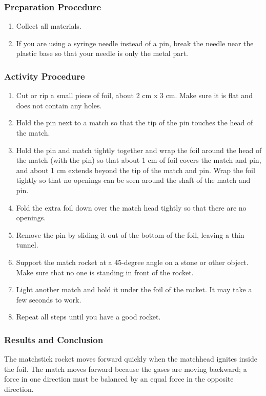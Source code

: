 \subsubsection*{Preparation Procedure}
\begin{enumerate}
\item{Collect all materials.} 
\item{If you are using a syringe needle instead of a pin, break the needle near the plastic base so that your needle is only the metal part.} 
\end{enumerate}

\subsubsection*{Activity Procedure}
\begin{enumerate}
\item{Cut or rip a small piece of foil, about 2 cm x 3 cm. Make sure it is flat and does not contain any holes.} 
\item{Hold the pin next to a match so that the tip of the pin touches the head of the match.} 
\item{Hold the pin and match tightly together and wrap the foil around the head of the match (with the pin) so that about 1 cm of foil covers the match and pin, and about 1 cm extends beyond the tip of the match and pin. Wrap the foil tightly so that no openings can be seen around the shaft of the match and pin.} 
\item{Fold the extra foil down over the match head tightly so that there are no openings.} 
\item{Remove the pin by sliding it out of the bottom of the foil, leaving a thin tunnel.} 
\item{Support the match rocket at a 45-degree angle on a stone or other object. Make sure that no one is standing in front of the rocket.} 
\item{Light another match and hold it under the foil of the rocket. It may take a few seconds to work.} 
\item{Repeat all steps until you have a good rocket.} 
\end{enumerate}

\subsubsection*{Results and Conclusion}
The matchstick rocket moves forward quickly when the matchhead ignites inside the foil.  The match moves forward because the gases are moving backward; a force in one direction must be balanced by an equal force in the opposite direction.  

